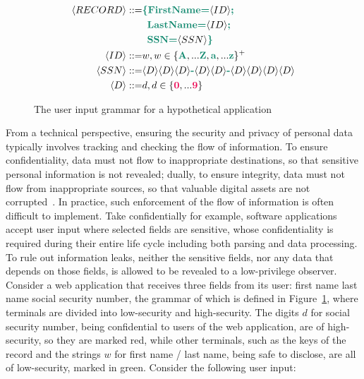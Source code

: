 \begin{figure}[tbp]
  \small
  \begin{align*}
    \langle RECORD \rangle ::= & {\color{green} \textbf{\{FirstName=}} \langle ID \rangle {\color{green} \textbf{;}} \\
                               & \enspace {\color{green} \textbf{LastName=}} \langle ID \rangle {\color{green} \textbf{;}} \\
                               & \enspace {\color{green} \textbf{SSN=}} \langle SSN \rangle {\color{green} \textbf{\}}} \\
    \langle ID \rangle     ::= & w , w \in \{ {\color{green} \textbf{A}}, ... {\color{green} \textbf{Z}}, {\color{green} \textbf{a}}, ... {\color{green} \textbf{z}} \}^{+} \\
    \langle SSN \rangle    ::= & \langle D \rangle \langle D \rangle \langle D \rangle {\color{green} \textbf{-}}
                                 \langle D \rangle \langle D \rangle {\color{green} \textbf{-}}
                                 \langle D \rangle \langle D \rangle \langle D \rangle \langle D \rangle \\
    \langle D \rangle      ::= & d , d \in \{ {\color{red} \textbf{0}}, ... {\color{red} \textbf{9}} \}
  \end{align*}
  \caption{The user input grammar for a hypothetical application}
  \label{fig:grammar}
\end{figure}

From a technical perspective, ensuring the security and privacy of
personal data typically involves tracking and checking
the flow of information. To ensure confidentiality, data must not
flow to inappropriate destinations, so that sensitive personal information
is not revealed; dually, to ensure integrity, data must not flow from
inappropriate sources, so that valuable digital assets are not
corrupted~\cite{sabelfeld2003language,biba1977integrity}.
In practice, such enforcement of the flow of information is often difficult
to implement. Take confidentially for example, software applications accept
user input where selected fields are sensitive, whose confidentiality is required
during their entire life cycle including both parsing and data processing.
To rule out information leaks, neither the sensitive fields, nor any data that depends on
those fields, is allowed to be revealed to a low-privilege observer.
Consider a web application that receives three fields from its user:
 first name  last name 
social security number, the grammar of which
is defined in Figure~\ref{fig:grammar}, where terminals are divided into
low-security and high-security.
The digits $d$ for social security number, being confidential to users of
the web application, are of high-security, so they are marked {\color{red}
  red}, while other terminals, such as the keys of the record and the
strings $w$ for first name / last name, being safe to disclose, are
all of low-security, marked in {\color{green} green}.
Consider the following user input:

